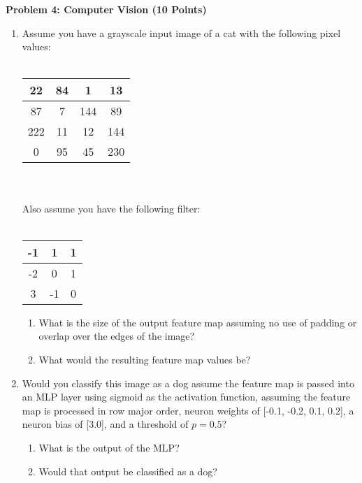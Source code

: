 \documentclass[]{article}
\begin{document}
\clearpage
\textbf{Problem 4: Computer Vision (10 Points)}\\
\begin{enumerate}[label=(\alph*)]
    \item Assume you have a grayscale input image of a cat with the following pixel values:
        \\ \\
        \begin{tabular}{|c|c|c|c|}
            \hline
            22 & 84 & 1 & 13\\ 
            \hline
            87 & 7 & 144  & 89\\  
            \hline
            222 & 11 & 12 & 144 \\
            \hline
            0 & 95 & 45 & 230 \\
            \hline
        \end{tabular}\\\\
        Also assume you have the following filter:\\\\
        \begin{tabular}{|c|c|c|}
            \hline
            -1 & 1 & 1 \\ 
            \hline
            -2 & 0 & 1\\  
            \hline
            3 & -1 & 0\\
            \hline
        \end{tabular}
        \begin{enumerate}[label=(\roman*)]
            \item What is the size of the output feature map assuming no use of padding or overlap over the edges of the image?
            \item What would the resulting feature map values be?
        \end{enumerate}

    \item Would you classify this image as a dog assume the feature map is passed into an MLP layer using sigmoid as the activation function, assuming the feature map is processed in row major order, neuron weights of [-0.1, -0.2, 0.1, 0.2], a neuron bias of [3.0], and a threshold of $p=0.5$?
    \begin{enumerate}[label=(\roman*)]
        \item What is the output of the MLP?
        \item Would that output be classified as a dog?
    \end{enumerate}
    

\end{enumerate}
\end{document}

